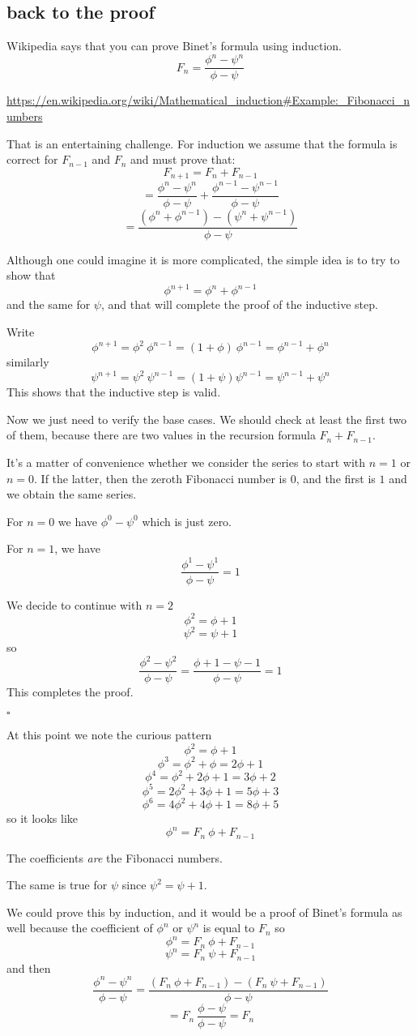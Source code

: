 \documentclass[11pt, oneside]{article}
\begin{document}
\subsection*{back to the proof}
Wikipedia says that you can prove Binet's formula using induction.
\[ F_n = \frac{\phi^n - \psi^n}{\phi - \psi} \]

\url{https://en.wikipedia.org/wiki/Mathematical_induction#Example:_Fibonacci_numbers}

That is an entertaining challenge.  For induction we assume that the formula is correct for $F_{n-1}$ and $F_n$ and must prove that:
\[ F_{n+1} = F_n + F_{n-1} \]
\[ = \frac{\phi^n - \psi^n}{\phi - \psi} + \frac{\phi^{n-1} - \psi^{n-1}}{\phi - \psi} \]
\[ = \frac{(\phi^n + \phi^{n-1}) - (\psi^{n} + \psi^{n-1})}{\phi - \psi} \]

Although one could imagine it is more complicated, the simple idea is to try to show that
\[ \phi^{n+1} = \phi^n + \phi^{n-1} \]
and the same for $\psi$, and that will complete the proof of the inductive step.

Write
\[ \phi^{n+1} = \phi^2 \ \phi^{n - 1} = (1 + \phi) \ \phi^{n - 1} = \phi^{n-1} + \phi^n  \]
similarly
\[ \psi^{n+1} = \psi^2 \ \psi^{n - 1} = (1 + \psi)\psi^{n-1} = \psi^{n-1} + \psi^n \]
This shows that the inductive step is valid.

Now we just need to verify the base cases.  We should check at least the first two of them, because there are two values in the recursion formula $F_{n} + F_{n-1}$.

It's a matter of convenience whether we consider the series to start with $n=1$ or $n=0$.  If the latter, then the zeroth Fibonacci number is $0$, and the first is $1$ and we obtain the same series.

For $n = 0$ we have $\phi^0 - \psi^0$ which is just zero.

For $n = 1$, we have 
\[ \frac{\phi^1 - \psi^1}{\phi - \psi}  = 1 \]

We decide to continue with $n = 2$
\[ \phi^2 = \phi + 1 \]
\[ \psi^2 = \psi + 1 \]
so
\[ \frac{\phi^2 - \psi^2}{\phi - \psi} = \frac{\phi + 1 - \psi - 1}{\phi - \psi} = 1 \]
This completes the proof. 

$\square$

At this point we note the curious pattern
\[ \phi^2 = \phi + 1 \]
\[ \phi^3 = \phi^2 + \phi = 2 \phi + 1 \]
\[ \phi^4 = \phi^2 + 2 \phi + 1 = 3 \phi + 2 \]
\[ \phi^5 = 2 \phi^2 + 3 \phi + 1 =  5 \phi + 3 \] 
\[ \phi^6 = 4 \phi^2 + 4 \phi + 1 = 8 \phi + 5 \]
so it looks like
\[ \phi^n = F_n \ \phi + F_{n-1} \]

The coefficients \emph{are} the Fibonacci numbers.  

The same is true for $\psi$ since $\psi^2 = \psi + 1$.

We could prove this by induction, and it would be a proof of Binet's formula as well because the coefficient of $\phi^n$ or $\psi^n$ is equal to $F_n$ so
\[ \phi^n = F_n \ \phi + F_{n-1} \]
\[ \psi^n = F_n \ \psi + F_{n-1} \]
and then
\[ \frac{\phi^n - \psi^n}{\phi - \psi} = \frac{(F_n \ \phi + F_{n-1}) - (F_n \ \psi + F_{n-1})}{\phi - \psi} \]
\[ = F_n \ \frac{\phi - \psi}{\phi - \psi}  = F_n \]
\end{document}

